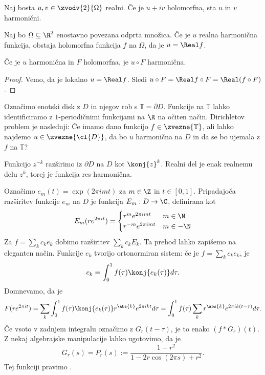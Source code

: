 
\begin{trditev}
  Naj bosta $u, v \in \zvodv{2}{\Omega}$ realni.
  Če je $u + i v$ holomorfna, sta $u$ in $v$ harmonični.
\end{trditev}

\begin{trditev}
  Naj bo $\Omega \subseteq \R^2$ enostavno povezana odprta množica.
  Če je $u$ realna harmonična funkcija, obstaja holomorfna funkcija $f$ na
  $\Omega$, da je $u = \Real f$.
\end{trditev}

\begin{posledica}
  Če je $u$ harmonična in $F$ holomorfna, je $u \circ F$ harmonična.
\end{posledica}

\begin{proof}
  Vemo, da je lokalno $u = \Real f$.
  Sledi $u\circ F = \Real f \circ F = \Real (f \circ F)$.
\end{proof}



Označimo enotski disk z $D$ in njegov rob s $\mathbb{T} = \partial D$.
Funkcije na $\mathbb{T}$ lahko identificiramo z $1$-periodičnimi funkcijami na
$\R$ na očiten način.
Dirichletov problem je naslednji:
Če imamo dano funkcijo $f \in \zvezne{\mathbb{T}}$, ali lahko najdemo $u \in
\zvezne{\cl{D}}$, da bo $u$ harmonična na $D$ in da se bo ujemala z $f$ na
$\mathbb{T}$?

\begin{primer}
  Funkcijo $z^{-k}$ razširimo iz $\partial D$ na $D$ kot $\konj{z}^k$.
  Realni del je enak realnemu delu $z^k$, torej je funkcija res harmonična.
\end{primer}


Označimo $e_m(t) = \exp(2 \pi i m t)$ za $m \in \Z$ in $t \in [0,1]$.
Pripadajoča razširitev funkcije $e_m$ na $D$ je funkcija $E_m: D \to \C$,
definirana kot
\[
  E_m(r e^{2 \pi i t}) =
  \begin{cases}
	r^m e^{2 \pi i m t} & m \in \N \\
	r^{-m} e^{2 \pi i m t} & m \in -\N
  \end{cases}
\]
Za $f = \sum_k c_k e_k$ dobimo razširitev $\sum_k c_k E_k$.
Ta prehod lahko zapišemo na eleganten način.
Funkcije $e_k$ tvorijo ortonormiran sistem: če je $f = \sum_k c_k e_k$, je
\[
  c_k = \int_0^1 f(\tau) \konj{e_k(\tau)} d\tau.
\]
Domnevamo, da je
\[
  F(r e^{2 \pi i t})
  = \sum_k \int_0^1 f(\tau) \konj{e_k(\tau)} r^{\abs{k}} e^{2 \pi i k t} d\tau
  = \int_0^1 f(\tau) \sum_k r^{\abs{k}} e^{2 \pi i k (t - \tau)} d\tau.
\]
Če vsoto v zadnjem integralu označimo z $G_r(t - \tau)$, je to enako $(f *
G_r)(t)$.
Z nekaj algebrajske manipulacije lahko ugotovimo, da je
\[
  G_r(s) = P_r(s) := \frac{1 - r^2}{1 - 2 r \cos (2 \pi s) + r^2}.
\]
Tej funkciji pravimo .

